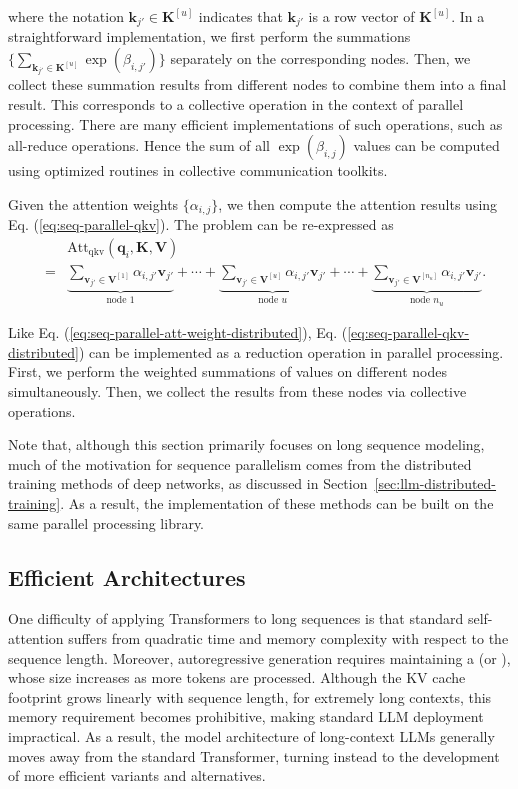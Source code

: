 \noindent where the notation $\mathbf{k}_{j'} \in \mathbf{K}^{[u]}$ indicates that $\mathbf{k}_{j'}$ is a row vector of $\mathbf{K}^{[u]}$. In a straightforward implementation, we first perform the summations $\{ \sum_{\mathbf{k}_{j'} \in \mathbf{K}^{[u]}} \exp(\beta_{i,j'}) \}$ separately on the corresponding nodes. Then, we collect these summation results from different nodes to combine them into a final result. This corresponds to a collective operation in the context of parallel processing. There are many efficient implementations of such operations, such as all-reduce operations. Hence the sum of all $\exp(\beta_{i,j})$ values can be computed using optimized routines in collective communication toolkits.

Given the attention weights $\{\alpha_{i,j}\}$, we then compute the attention results using Eq. (\ref{eq:seq-parallel-qkv}). The problem can be re-expressed as
\begin{eqnarray}
&   & \mathrm{Att}_{\mathrm{qkv}}(\mathbf{q}_i,\mathbf{K},\mathbf{V}) \nonumber \\
& = & \underbrace{\sum_{\mathbf{v}_{j'} \in \mathbf{V}^{[1]}} \alpha_{i,j'} \mathbf{v}_{j'} }_{\textrm{node $1$}} + \cdots + \underbrace{\sum_{\mathbf{v}_{j'} \in \mathbf{V}^{[u]}} \alpha_{i,j'} \mathbf{v}_{j'} }_{\textrm{node $u$}} + \cdots + \underbrace{\sum_{\mathbf{v}_{j'} \in \mathbf{V}^{[n_u]}} \alpha_{i,j'} \mathbf{v}_{j'} }_{\textrm{node $n_u$}} \label{eq:seq-parallel-qkv-distributed}.
\end{eqnarray}

Like Eq. (\ref{eq:seq-parallel-att-weight-distributed}), Eq. (\ref{eq:seq-parallel-qkv-distributed}) can be implemented as a reduction operation in parallel processing. First, we perform the weighted summations of values on different nodes simultaneously. Then, we collect the results from these nodes via collective operations.

Note that, although this section primarily focuses on long sequence modeling, much of the motivation for sequence parallelism comes from the distributed training methods of deep networks, as discussed in Section~\ref{sec:llm-distributed-training}. As a result, the implementation of these methods can be built on the same parallel processing library.

\subsection{Efficient Architectures}

\noindent One difficulty of applying Transformers to long sequences is that standard self-attention suffers from quadratic time and memory complexity with respect to the sequence length.  Moreover, autoregressive generation requires maintaining a  (or ), whose size increases as more tokens are processed. Although the KV cache footprint grows linearly with sequence length, for extremely long contexts, this memory requirement becomes prohibitive, making standard LLM deployment impractical. As a result, the model architecture of long-context LLMs generally moves away from the standard Transformer, turning instead to the development of more efficient variants and alternatives.

